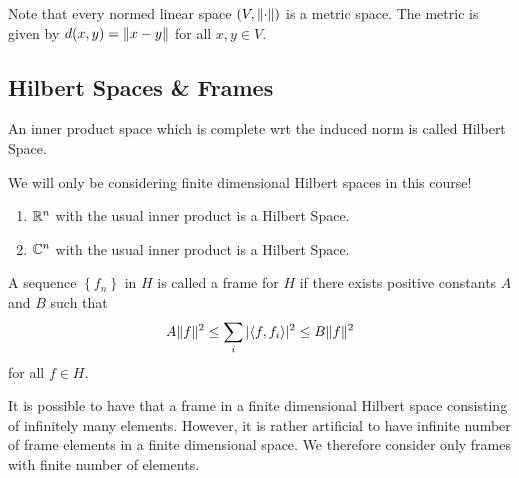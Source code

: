 Note that every normed linear space $\left( V, \lVert \cdot \rVert \right)$ is a metric space. The metric is given by $d (x, y) = \lVert x-y \rVert$ for all $x,y \in V$.

\subsection{Hilbert Spaces \& Frames}

\begin{definition}
    An inner product space which is complete wrt the induced norm is called Hilbert Space.
    \label{def:Hilbert-Space}
\end{definition}

We will only be considering finite dimensional Hilbert spaces in this course!

\begin{example}
    \begin{enumerate}
	\item $\mathbb R ^n$ with the usual inner product is a Hilbert Space.
	\item $\mathbb C ^n$ with the usual inner product is a Hilbert Space.
	\end{enumerate}
\end{example}

\begin{definition}
    A sequence $\left\{ f_n \right\}$ in $H$ is called a frame for $H$ if there exists positive constants $A$ and $B$ such that
    $$A\lVert f \rVert^2 \le \sum_{i} |\langle f, f_i \rangle|^2 \le B \lVert f \rVert^2$$
    for all $f\in H$.
    \label{def:frame}
\end{definition}

\begin{remark}
    It is possible to have that a frame in a finite dimensional Hilbert space consisting of infinitely many elements. However, it is rather artificial to have infinite number of frame elements in a finite dimensional space. We therefore consider only frames with finite number of elements.
    \label{rem:finite-frames}
\end{remark}


